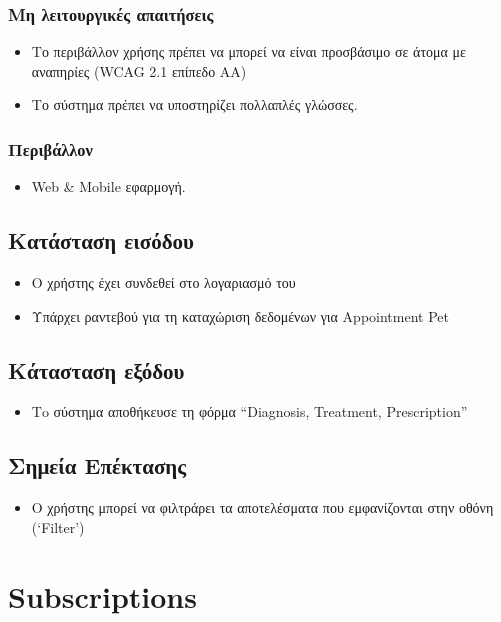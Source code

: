 \documentclass[12pt,a4paper,twoside]{book}
\begin{document}
\subsubsection{Μη λειτουργικές απαιτήσεις}
\begin{itemize}
  \item Το περιβάλλον χρήσης πρέπει να μπορεί να  είναι προσβάσιμο σε  άτομα με αναπηρίες (WCAG 2.1 επίπεδο AA) %
  \item Το σύστημα πρέπει να υποστηρίζει πολλαπλές γλώσσες.
\end{itemize}

\subsubsection{Περιβάλλον}
\begin{itemize}
  \item Web \& Mobile εφαρμογή.
\end{itemize}

\subsection{Κατάσταση εισόδου} %
\begin{itemize}
  \item Ο χρήστης έχει συνδεθεί στο λογαριασμό του %
  \item Υπάρχει ραντεβού για τη καταχώριση δεδομένων για Appointment Pet   %
\end{itemize}

\subsection{Κάτασταση εξόδου} %
\begin{itemize}
  \item Τo σύστημα αποθήκευσε τη φόρμα “Diagnosis, Treatment, Prescription”
\end{itemize}

\subsection{Σημεία Επέκτασης}
\begin{itemize}
  \item Ο χρήστης μπορεί να φιλτράρει τα αποτελέσματα που εμφανίζονται στην οθόνη (`Filter') %
\end{itemize}

\section{Subscriptions}
\end{document}
